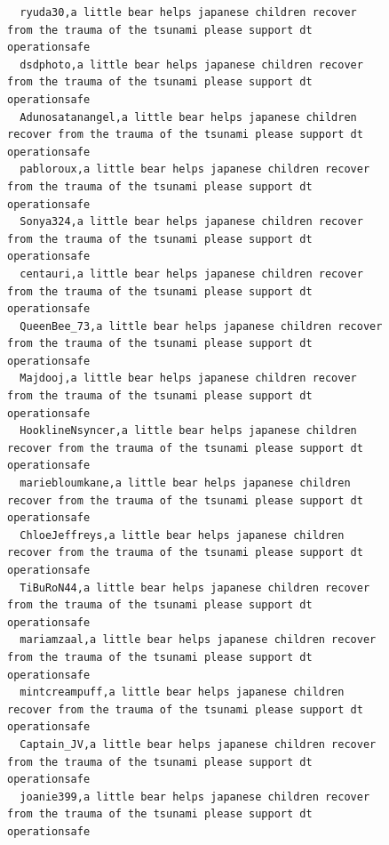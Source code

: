 \begin{figure}[htpb]
\begin{verbatim}
  ryuda30,a little bear helps japanese children recover from the trauma of the tsunami please support dt operationsafe
  dsdphoto,a little bear helps japanese children recover from the trauma of the tsunami please support dt operationsafe
  Adunosatanangel,a little bear helps japanese children recover from the trauma of the tsunami please support dt operationsafe
  pabloroux,a little bear helps japanese children recover from the trauma of the tsunami please support dt operationsafe
  Sonya324,a little bear helps japanese children recover from the trauma of the tsunami please support dt operationsafe
  centauri,a little bear helps japanese children recover from the trauma of the tsunami please support dt operationsafe
  QueenBee_73,a little bear helps japanese children recover from the trauma of the tsunami please support dt operationsafe
  Majdooj,a little bear helps japanese children recover from the trauma of the tsunami please support dt operationsafe
  HooklineNsyncer,a little bear helps japanese children recover from the trauma of the tsunami please support dt operationsafe
  mariebloumkane,a little bear helps japanese children recover from the trauma of the tsunami please support dt operationsafe
  ChloeJeffreys,a little bear helps japanese children recover from the trauma of the tsunami please support dt operationsafe
  TiBuRoN44,a little bear helps japanese children recover from the trauma of the tsunami please support dt operationsafe
  mariamzaal,a little bear helps japanese children recover from the trauma of the tsunami please support dt operationsafe
  mintcreampuff,a little bear helps japanese children recover from the trauma of the tsunami please support dt operationsafe
  Captain_JV,a little bear helps japanese children recover from the trauma of the tsunami please support dt operationsafe
  joanie399,a little bear helps japanese children recover from the trauma of the tsunami please support dt operationsafe


\end{verbatim}
\end{figure}
